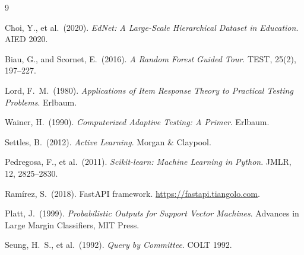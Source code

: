 \documentclass[12pt,a4paper]{article}
\begin{document}
\begin{thebibliography}{9}

  Choi, Y., et al.\ (2020).
  \emph{EdNet: A Large-Scale Hierarchical Dataset in Education}.
  AIED 2020.

  Biau, G., and Scornet, E.\ (2016).
  \emph{A Random Forest Guided Tour}.
  TEST, 25(2), 197--227.

  Lord, F.\ M.\ (1980).
  \emph{Applications of Item Response Theory to Practical Testing Problems}.
  Erlbaum.

  Wainer, H.\ (1990).
  \emph{Computerized Adaptive Testing: A Primer}.
  Erlbaum.

  Settles, B.\ (2012).
  \emph{Active Learning}.
  Morgan \& Claypool.

  Pedregosa, F., et al.\ (2011).
  \emph{Scikit-learn: Machine Learning in Python}.
  JMLR, 12, 2825--2830.

  Ramírez, S.\ (2018).
  FastAPI framework.
  \url{https://fastapi.tiangolo.com}.

  Platt, J.\ (1999).
  \emph{Probabilistic Outputs for Support Vector Machines}.
  Advances in Large Margin Classifiers, MIT Press.

  Seung, H.\ S., et al.\ (1992).
  \emph{Query by Committee}.
  COLT 1992.

\end{thebibliography}
\end{document}
